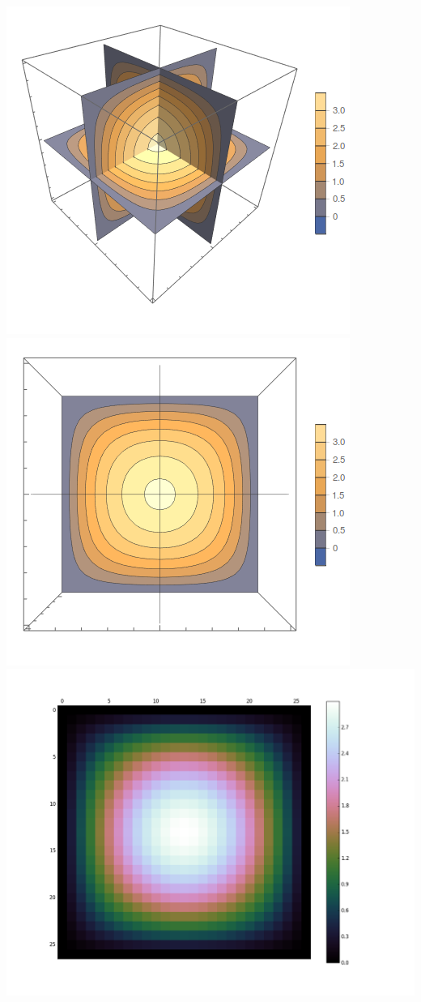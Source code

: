 \documentclass{beamer}
\begin{document}
\begin{frame}

\includegraphics[scale=0.25]{analytic.png}
\includegraphics[scale=0.25]{top-down-analytic.png}
\includegraphics[scale=0.14]{numerical-sol.png}

\end{frame}
\end{document}
